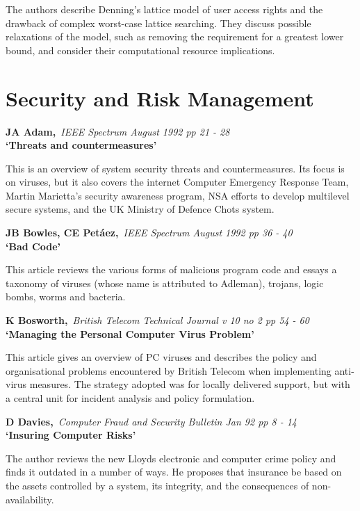 The authors describe Denning's lattice model of user access rights and the
drawback of complex worst-case lattice searching. They discuss possible
relaxations of the model, such as removing the requirement for a greatest
lower bound, and consider their computational resource implications.



\pagebreak
\normalsize
\section{Security and Risk Management}
\small

{\bf \noindent JA Adam,}{\em ~IEEE Spectrum August 1992 pp 21 - 28\\}
{\bf `Threats and countermeasures'}

This is an overview of system security threats and countermeasures. Its 
focus is on viruses, but it also covers the internet Computer Emergency
Response Team, Martin Marietta's security awareness program, NSA efforts to
develop multilevel secure systems, and the UK Ministry of Defence Chots system.

{\bf \noindent JB Bowles, CE Pet\'aez,}{\em ~IEEE Spectrum August 1992 pp 
36 - 40\\}
{\bf `Bad Code'}

This article reviews the various forms of malicious program code and essays
a taxonomy of viruses (whose name is attributed to Adleman), trojans, logic
bombs, worms and bacteria.

{\bf \noindent K Bosworth,}{\em ~British Telecom Technical Journal v 10 no 2 
pp 54 - 60\\}
{\bf `Managing the Personal Computer Virus Problem'}

This article gives an overview of PC viruses and describes the policy and
organisational problems encountered by British Telecom when implementing
anti-virus measures. The strategy adopted was for locally delivered support,
but with a central unit for incident analysis and policy formulation.

{\bf \noindent D Davies,}{\em ~Computer Fraud and Security Bulletin Jan 92
pp 8 - 14\\}
{\bf `Insuring Computer Risks'}

The author reviews the new Lloyds electronic and computer crime policy and
finds it outdated in a number of ways. He proposes that insurance be based
on the assets controlled by a system, its integrity, and the consequences of
non-availability.

